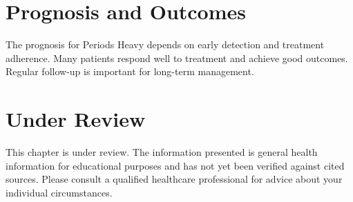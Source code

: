 \section*{Prognosis and Outcomes}
The prognosis for Periods Heavy depends on early detection and treatment adherence. Many patients respond well to treatment and achieve good outcomes. Regular follow-up is important for long-term management.
\section*{Under Review}
This chapter is under review. The information presented is general health information for educational purposes and has not yet been verified against cited sources. Please consult a qualified healthcare professional for advice about your individual circumstances.


\clearpage

